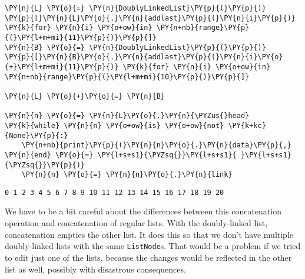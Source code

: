 \begin{Verbatim}[commandchars=\\\{\}]
\PY{n}{L} \PY{o}{=} \PY{n}{DoublyLinkedList}\PY{p}{(}\PY{p}{)}
\PY{p}{[}\PY{n}{L}\PY{o}{.}\PY{n}{addlast}\PY{p}{(}\PY{n}{i}\PY{p}{)} \PY{k}{for} \PY{n}{i} \PY{o+ow}{in} \PY{n+nb}{range}\PY{p}{(}\PY{l+m+mi}{11}\PY{p}{)}\PY{p}{]}
\PY{n}{B} \PY{o}{=} \PY{n}{DoublyLinkedList}\PY{p}{(}\PY{p}{)}
\PY{p}{[}\PY{n}{B}\PY{o}{.}\PY{n}{addlast}\PY{p}{(}\PY{n}{i}\PY{o}{+}\PY{l+m+mi}{11}\PY{p}{)} \PY{k}{for} \PY{n}{i} \PY{o+ow}{in} \PY{n+nb}{range}\PY{p}{(}\PY{l+m+mi}{10}\PY{p}{)}\PY{p}{]}

\PY{n}{L} \PY{o}{+}\PY{o}{=} \PY{n}{B}

\PY{n}{n} \PY{o}{=} \PY{n}{L}\PY{o}{.}\PY{n}{\PYZus{}head}
\PY{k}{while} \PY{n}{n} \PY{o+ow}{is} \PY{o+ow}{not} \PY{k+kc}{None}\PY{p}{:}
    \PY{n+nb}{print}\PY{p}{(}\PY{n}{n}\PY{o}{.}\PY{n}{data}\PY{p}{,} \PY{n}{end} \PY{o}{=} \PY{l+s+s1}{\PYZsq{}}\PY{l+s+s1}{ }\PY{l+s+s1}{\PYZsq{}}\PY{p}{)}
    \PY{n}{n} \PY{o}{=} \PY{n}{n}\PY{o}{.}\PY{n}{link}
\end{Verbatim}

\begin{Verbatim}
0 1 2 3 4 5 6 7 8 9 10 11 12 13 14 15 16 17 18 19 20 \end{Verbatim}


We have to be a bit careful about the differences between this concatenation operation and concatenation of regular lists.  With the doubly-linked list, concatenation empties the other list.  It does this so that we don’t have multiple doubly-linked lists with the same \texttt{ListNode}s.    That would be a problem if we tried to edit just one of the lists, because the changes would be reflected in the other list as well, possibly with disastrous consequences.
